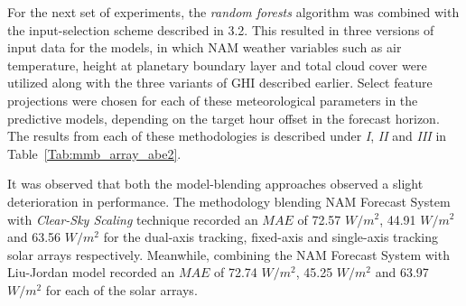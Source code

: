 \par For the next set of experiments, the \textit{random forests} algorithm was combined with the input-selection scheme described in 3.2. This resulted in three versions of input data for the models, in which NAM weather variables such as air temperature, height at planetary boundary layer and total cloud cover were utilized along with the three variants of GHI described earlier. Select feature projections were chosen for each of these meteorological parameters in the predictive models, depending on the target hour offset in the forecast horizon. The results from each of these methodologies is described under \textit{I}, \textit{II} and \textit{III} in Table~\ref{Tab:mmb_array_abe2}.

\par It was observed that both the model-blending approaches observed a slight deterioration in performance. The methodology blending NAM Forecast System with \textit{Clear-Sky Scaling} technique recorded an $MAE$ of 72.57 $W/m^2$, 44.91 $W/m^2$ and 63.56 $W/m^2$ for the dual-axis tracking, fixed-axis and single-axis tracking solar arrays respectively. Meanwhile, combining the NAM Forecast System with Liu-Jordan model recorded an $MAE$ of 72.74 $W/m^2$, 45.25 $W/m^2$ and 63.97 $W/m^2$ for each of the solar arrays.

